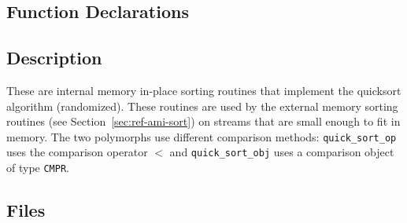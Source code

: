 \subsection{Function Declarations}

  \btabb
      {}

      {}
  \etabb

\subsection{Description}

These are internal memory in-place sorting routines that implement the
quicksort algorithm (randomized).  These routines are used by the external memory sorting
routines (see Section~\ref{sec:ref-ami-sort}) on streams that are
small enough to fit in memory.  The two polymorphs use different
comparison methods: \lstinline|quick_sort_op| uses the comparison
operator $<$ and \lstinline|quick_sort_obj| uses a comparison object
of type \lstinline|CMPR|.


\clearpage

\tobewritten


\clearpage

\tobewritten


\clearpage

\tobewritten


\clearpage

\subsection{Files}
  \btabb
         {}
  \etabb

